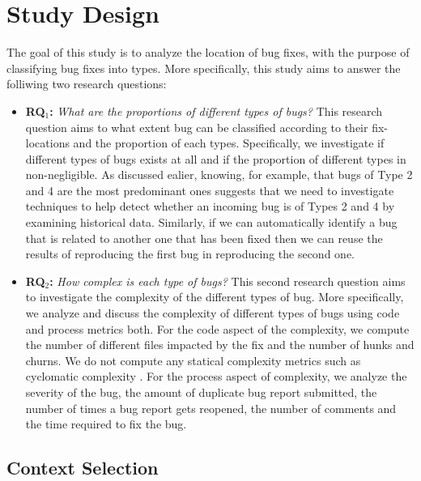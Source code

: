 
\section{Study Design}

The goal of this study is to analyze the location of bug fixes, with the purpose of classifying bug fixes into types.
More specifically, this study aims to answer the folliwing two research questions:

\begin{itemize}
	\item {\bf RQ$_1$:} {\it What are the proportions of different types of bugs?} This research question aims to what extent bug can be classified according to their fix-locations and the proportion of each types.
  Specifically, we investigate if different types of bugs exists at all and if the proportion of different types in non-negligible.
  As discussed ealier, knowing, for example, that bugs of Type 2 and 4 are the most predominant ones suggests that we need to investigate techniques to help detect whether an incoming bug is of Types 2 and 4 by examining historical data.
  Similarly, if we can automatically identify a bug that is related to another one that has been fixed then we can reuse the results of reproducing the first bug in reproducing the second one.

	\item {\bf RQ$_2$:} {\it How complex is each type of bugs?} This second research question aims to investigate the complexity of the different types of bug.
  More specifically, we analyze and discuss the complexity of different types of bugs using code and process metrics both.
  For the code aspect of the complexity, we compute the number of different files impacted by the fix and the number of hunks and churns.
  We do not compute any statical complexity metrics such as cyclomatic complexity \cite{McCabe1989}.
  For the process aspect of complexity, we analyze the severity of the bug, the amount of duplicate bug report submitted, the number of times a bug report gets reopened, the number of comments and the time required to fix the bug.

\end{itemize}

\subsection{Context Selection}

